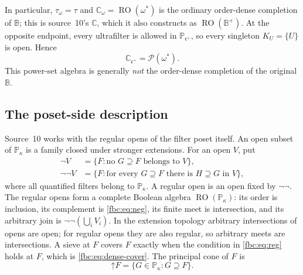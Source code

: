 \documentclass[11pt,letterpaper]{article}
\theoremstyle{definition}
\theoremstyle{remark}
\newcommand{\om}{\omega}
\newcommand{\B}{\mathbb B}
\newcommand{\C}{\mathbb C}
\newcommand{\PP}{\mathbb P}
\newcommand{\pow}{\mathcal P}
\newcommand{\cc}{\mathfrak c}
\newcommand{\up}{\mathord{\uparrow}}
\newcommand{\RO}{\operatorname{RO}}
\begin{document}
In particular, $\tau_\om=\tau$ and $\C_\om=\RO(\om^*)$ is the
ordinary order-dense completion of $\B$; this is source~10's $\mathbb C$,
which it also constructs as $\RO(\B^+)$. At the opposite endpoint,
every ultrafilter is allowed in $\PP_{\cc^+}$, so every singleton
$K_U=\{U\}$ is open. Hence
\begin{equation}\label{fbc:eq:full-completion}
 \C_{\cc^+}=\pow(\om^*).
\end{equation}
This power-set algebra is generally \emph{not} the order-dense
completion of the original $\B$.

\subsection{The poset-side description}
\label{fbc:sec:poset-side}
Source~10 works with the regular opens of the filter poset itself.
An open subset of $\PP_\kappa$ is a family closed under stronger
extensions. For an open $V$, put
\begin{align}
 \neg V&=\{F:\text{no }G\supseteq F\text{ belongs to }V\},\label{fbc:eq:neg}\\
 \neg\neg V&=\{F:\text{for every }G\supseteq F\text{ there is }
 H\supseteq G\text{ in }V\},\label{fbc:eq:reg}
\end{align}
where all quantified filters belong to $\PP_\kappa$. A regular open is an
open fixed by $\neg\neg$. The regular opens form a complete Boolean
algebra $\RO(\PP_\kappa)$: its order is inclusion, its complement is
\eqref{fbc:eq:neg}, its finite meet is intersection, and its arbitrary
join is $\neg\neg(\bigcup_iV_i)$. In the extension topology arbitrary
intersections of opens are open; for regular opens they are also
regular, so arbitrary meets are intersections. A sieve at $F$ covers
$F$ exactly when the condition in \eqref{fbc:eq:reg} holds at $F$, which
is \eqref{fbc:eq:dense-cover}. The principal cone of $F$ is
\[
 \up F=\{G\in\PP_\kappa:G\supseteq F\}.
\]
\end{document}
